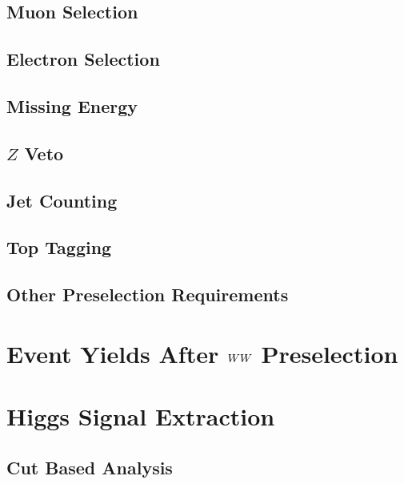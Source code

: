 \documentclass{cmspaper}
\begin{document}
  \subsection{Muon Selection} 
    \label{sec:sel_muons}
   
  \subsection{Electron Selection} 
    \label{sec:sel_electrons}
    
  \subsection{Missing Energy} 
    \label{sec:sel_met}
    
  \subsection{$Z$ Veto}
    \label{sec:sel_zveto}
    
  \subsection{Jet Counting} 
    \label{sec:sel_jets}
    
  \subsection{Top Tagging}
    \label{sec:sel_toptag}
    
  \subsection{Other Preselection Requirements}
    \label{sec:sel_other}
    

\section{Event Yields After $WW$ Preselection}
  \label{sec:yields}
  
    
\section{Higgs Signal Extraction}
  
  \label{sec:signal_selection}
  \subsection{Cut Based Analysis}
    \label{sec:anal_cutbased}
\end{document}
